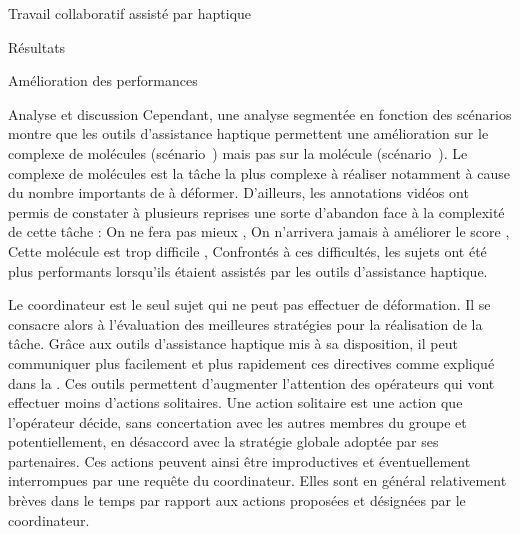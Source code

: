\documentclass[myfrancais,ngerman,english,frenchb]{mythesis}
\begin{document}
\begin{mychapter}{Travail collaboratif assisté par haptique}
\begin{mysection}{Résultats}
\begin{mysubsection}{Amélioration des performances}
\begin{mysubsubsection}{Analyse et discussion}
					Cependant, une analyse segmentée en fonction des scénarios montre que les outils d'assistance haptique permettent une amélioration sur le complexe de molécules \myNusENusG (scénario~) mais pas sur la molécule \myUbiquitin (scénario~).
					Le complexe de molécules \myNusENusG est la tâche la plus complexe à réaliser notamment à cause du nombre importants de  à déformer.
					D'ailleurs, les annotations vidéos ont permis de constater à plusieurs reprises une sorte d'abandon face à la complexité de cette tâche : \og On ne fera pas mieux \fg, \og On n'arrivera jamais à améliorer le score \fg, \og Cette molécule est trop difficile \fg, \myetc
					Confrontés à ces difficultés, les sujets ont été plus performants lorsqu'ils étaient assistés par les outils d'assistance haptique.

					Le coordinateur est le seul sujet qui ne peut pas effectuer de déformation.
					Il se consacre alors à l'évaluation des meilleures stratégies pour la réalisation de la tâche.
					Grâce aux outils d'assistance haptique mis à sa disposition, il peut communiquer plus facilement et plus rapidement ces directives comme expliqué dans la .
					Ces outils permettent d'augmenter l'attention des opérateurs qui vont effectuer moins d'actions solitaires.
					Une action solitaire est une action que l'opérateur décide, sans concertation avec les autres membres du groupe et potentiellement, en désaccord avec la stratégie globale adoptée par ses partenaires.
					Ces actions peuvent ainsi être improductives et éventuellement interrompues par une requête du coordinateur.
					Elles sont en général relativement brèves dans le temps par rapport aux actions proposées et désignées par le coordinateur.


\end{mysubsubsection}
\end{mysubsection}
\end{mysection}
\end{mychapter}
\end{document}
